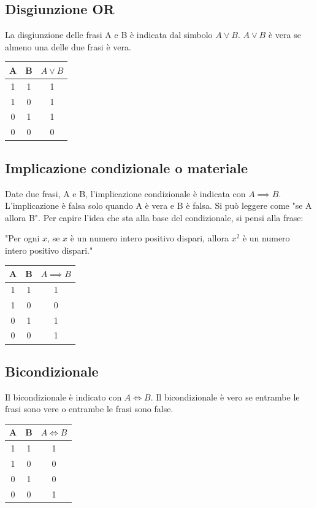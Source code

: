 \documentclass{article}
\begin{document}
\subsection{Disgiunzione OR}
La disgiunzione delle frasi A e B è indicata dal simbolo $A \lor B$. $A \lor B$ è vera se almeno una delle due frasi è vera.
\begin{center}
    \begin{tabular}{|c|c|c|}
        \hline
        A & B & $A \lor B$ \\
        \hline
        1 & 1 & 1 \\
        1 & 0 & 1 \\
        0 & 1 & 1 \\
        0 & 0 & 0 \\
        \hline
    \end{tabular}
\end{center}
\subsection{Implicazione condizionale o materiale}
Date due frasi, A e B, l'implicazione condizionale è indicata con $A \implies B$. L'implicazione è falsa solo quando A è vera e B è falsa. Si può leggere come "se A allora B". Per capire l'idea che sta alla base del condizionale, si pensi alla frase:
\begin{center}
    "Per ogni $x$, se $x$ è un numero intero positivo dispari, allora $x^2$ è un numero intero positivo dispari."
\end{center}

\begin{center}
    \begin{tabular}{|c|c|c|}
        \hline
        A & B & $A \implies B$ \\
        \hline
        1 & 1 & 1 \\
        1 & 0 & 0 \\
        0 & 1 & 1 \\
        0 & 0 & 1 \\
        \hline
    \end{tabular}
\end{center}
\subsection{Bicondizionale}
Il bicondizionale è indicato con $A \iff B$. Il bicondizionale è vero se entrambe le frasi sono vere o entrambe le frasi sono false.
\begin{center}
    \begin{tabular}{|c|c|c|}
        \hline
        A & B & $A \iff B$ \\
        \hline
        1 & 1 & 1 \\
        1 & 0 & 0 \\
        0 & 1 & 0 \\
        0 & 0 & 1 \\
        \hline
    \end{tabular}
\end{center}
\end{document}
